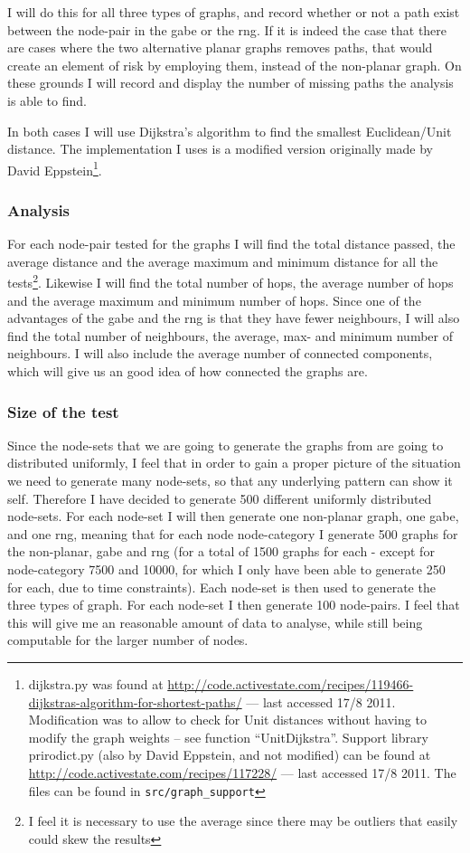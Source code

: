 I will do this for all three types of graphs, and record whether or not a path exist between the node-pair in the \ac{gabe} or the \ac{rng}. If it is indeed the case that there are cases where the two alternative planar graphs removes paths, that would create an element of risk by employing them, instead of the non-planar graph. On these grounds I will record and display the number of missing paths the analysis is able to find.

In both cases I will use Dijkstra's algorithm to find the smallest Euclidean/Unit distance. The implementation I uses is a modified version originally made by David Eppstein\footnote{dijkstra.py was found at \url{http://code.activestate.com/recipes/119466-dijkstras-algorithm-for-shortest-paths/} --- last accessed 17/8 2011. Modification was to allow to check for Unit distances without having to modify the graph weights -- see function ``UnitDijkstra''. Support library prirodict.py (also by David Eppstein, and not modified) can be found at \url{http://code.activestate.com/recipes/117228/} --- last accessed 17/8 2011. The files can be found in \texttt{src/graph_support}}.

\subsubsection{Analysis}
For each node-pair tested for the graphs I will find the total distance passed, the average distance and the average maximum and minimum distance for all the tests\footnote{I feel it is necessary to use the average since there may be outliers that easily could skew the results}. Likewise I will find the total number of hops, the average number of hops and the average maximum and minimum number of hops. Since one of the advantages of the \ac{gabe} and the \ac{rng} is that they have fewer neighbours, I will also find the total number of neighbours, the average, max- and minimum number of neighbours. I will also include the average number of connected components, which will give us an good idea of how connected the graphs are.

\subsubsection{Size of the test}
Since the node-sets that we are going to generate the graphs from are going to distributed uniformly, I feel that in order to gain a proper picture of the situation we need to generate many node-sets, so that any underlying pattern can show it self. Therefore I have decided to generate 500 different uniformly distributed node-sets. For each node-set I will then generate one non-planar graph, one \ac{gabe}, and one \ac{rng}, meaning that for each node node-category I  generate 500 graphs for the non-planar, \ac{gabe} and \ac{rng} (for a total of 1500 graphs for each - except for node-category 7500 and 10000, for which I only have been able to generate 250 for each, due to time constraints). Each node-set is then used to generate the three types of graph. For each node-set I then generate 100 node-pairs. I feel that this will give me an reasonable amount of data to analyse, while still being computable for the larger number of nodes.




